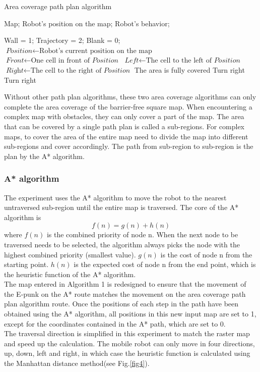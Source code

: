 \documentclass[conference]{IEEEtran}
\begin{document}
\begin{algorithm}[h]
 \caption{Area coverage path plan algorithm}
 \label{alg.l1}
 \begin{algorithmic}[1]
 \Require
 Map; Robot's position on the map;
 \Ensure
 Robot's behavior;
 
    \STATE Wall = 1;
    \STATE Trajectory = 2;
    \STATE Blank = 0;
    \STATE $\textit{Position} \gets \text{Robot's current position on the map}$
    \STATE $\textit{Front} \gets \text{One cell in front of } \textit{Position}$
    \STATE $\textit{Left} \gets \text{The cell to the left of } \textit{Position}$
    \STATE $\textit{Right} \gets \text{The cell to the right of } \textit{Position}$
    {
            {
                {The area is fully covered}
            {\ELSE}
                {Turn right}
            \ENDIF
        {
            {Turn right}}
        \ENDIF}
  \ENDIF}
  \label{code:recentEnd}
 \end{algorithmic}
\end{algorithm}

Without other path plan algorithms, these two area coverage algorithms can only complete the area coverage of the barrier-free square map. When encountering a complex map with obstacles, they can only cover a part of the map. The area that can be covered by a single path plan is called a sub-regions. For complex maps, to cover the area of the entire map need to divide the map into different sub-regions and cover accordingly. The path from sub-region to sub-region is the plan by the A* algorithm.

\subsubsection{A* algorithm}
The experiment uses the A* algorithm\cite{hart1968formal} to move the robot to the nearest untraversed sub-region until the entire map is traversed. The core of the A* algorithm is
\begin{equation}
  f(n) = g(n) + h(n)
\end{equation}
where $f(n)$ is the combined priority of node n. When the next node to be traversed needs to be selected, the algorithm always picks the node with the highest combined priority (smallest value). $g(n)$ is the cost of node n from the starting point. $h(n)$ is the expected cost of node n from the end point, which is the heuristic function of the A* algorithm.\\
The map entered in Algorithm 1 is redesigned to ensure that the movement of the E-punk on the A* route matches the movement on the area coverage path plan algorithm route. Once the positions of each step in the path have been obtained using the A* algorithm, all positions in this new input map are set to 1, except for the coordinates contained in the A* path, which are set to 0.\\
The traversal direction is simplified in this experiment to match the raster map and speed up the calculation. The mobile robot can only move in four directions, up, down, left and right, in which case the heuristic function is calculated using the Manhattan distance method(see Fig.\ref{fig4}).
\end{document}
